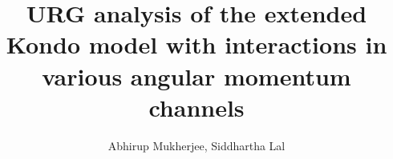 \documentclass{revtex4-2}
\begin{document}
\title{URG analysis of the extended Kondo model with interactions in various angular momentum channels}
\author{Abhirup Mukherjee, Siddhartha Lal}
\maketitle
\end{document}

